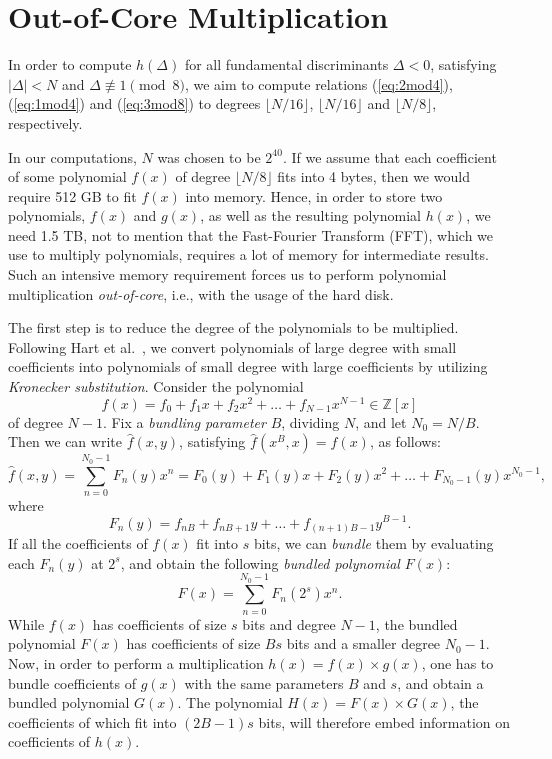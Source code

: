 \documentclass{mcom-l}
\theoremstyle{definition}
\begin{document}
\section{Out-of-Core Multiplication} \label{sec:out-of-core}

In order to compute $h(\Delta)$ for all fundamental discriminants
$\Delta < 0$, satisfying $|\Delta| < N$ and $\Delta \not \equiv 1
\pmod{8}$, we aim to compute relations (\ref{eq:2mod4}),
(\ref{eq:1mod4}) and (\ref{eq:3mod8}) to degrees $\lfloor N / 16
\rfloor$, $\lfloor N / 16 \rfloor$ and $\lfloor N / 8 \rfloor$,
respectively.

In our computations, $N$ was chosen to be $2^{40}$. If we assume that
each coefficient of some polynomial $f(x)$ of degree $\lfloor N / 8
\rfloor$ fits into 4 bytes, then we would require 512 GB to fit $f(x)$
into memory. Hence, in order to store two polynomials, $f(x)$ and
$g(x)$, as well as the resulting polynomial $h(x)$, we need 1.5 TB,
not to mention that the Fast-Fourier Transform (FFT), which we use to
multiply polynomials, requires a lot of memory for intermediate
results. Such an intensive memory requirement forces us to perform
polynomial multiplication \emph{out-of-core}, i.e., with the usage of
the hard disk.

The first step is to reduce the degree of the polynomials to be
multiplied.  Following Hart et al.\ \cite{hart}, we convert
polynomials of large degree with small coefficients into polynomials
of small degree with large coefficients by utilizing \emph{Kronecker
  substitution}. Consider the polynomial
$$
f(x) = f_0  + f_1x + f_2x^2 + \ldots + f_{N - 1}x^{N-1} \in \mathbb{Z}[x]
$$
of degree $N - 1$. Fix a \emph{bundling parameter} $B$, dividing $N$,
and let $N_0 = N/B$. Then we can write $\hat f(x, y)$, satisfying
$\hat f(x^B, x) = f(x)$, as follows:
$$
\hat f(x, y) = \sum_{n = 0}^{N_0 - 1} F_n(y)x^{n} = F_0(y) + F_1(y)x +
F_2(y)x^{2} + \ldots + F_{N_0 - 1}(y)x^{N_0 - 1}, 
$$
where
$$
F_n(y) = f_{nB} + f_{nB + 1}y + \ldots + f_{(n+1)B - 1}y^{B - 1}.
$$
If all the coefficients of $f(x)$ fit into $s$ bits, we can
\emph{bundle} them by evaluating each $F_n(y)$ at $2^s$, and obtain
the following \emph{bundled polynomial} $F(x)$:
\begin{equation} \label{eq:bundled_poly}
F(x) = \sum_{n = 0}^{N_0 - 1} F_n\left(2^s\right)x^n.
\end{equation}
While $f(x)$ has coefficients of size $s$ bits and degree $N - 1$, the
bundled polynomial $F(x)$ has coefficients of size $Bs$ bits and a
smaller degree $N_0 - 1$. Now, in order to perform
a multiplication $h(x) = f(x) \times g(x)$, one has to bundle
coefficients of $g(x)$ with the same parameters $B$ and $s$, and
obtain a bundled polynomial $G(x)$. The polynomial $H(x) = F(x) \times
G(x)$, the coefficients of which fit into $(2B-1)s$ bits, will
therefore embed information on coefficients of $h(x)$.
\end{document}
